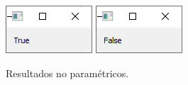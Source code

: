 %

\begin{figure}
\centering
  \includegraphics[width=0.3\linewidth]{images/stl_noparam_true} \hfill
  \includegraphics[width=0.3\linewidth]{images/stl_noparam_false} 
\caption{Resultados no paramétricos.}
\label{fig:noparam}
\end{figure}
